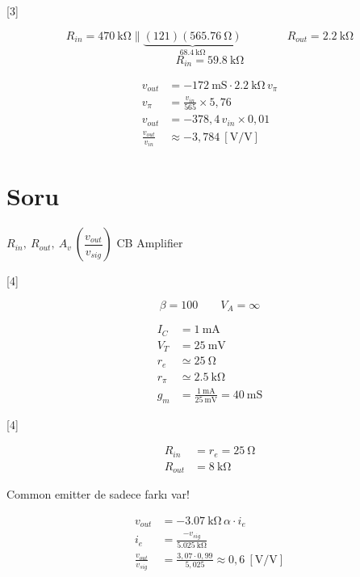 \documentclass[11pt,a4paper]{article}
\begin{document}
[3]

\[ R_{in} = \qty{470}{\kilo\ohm} \parallel \underbrace{(121)(\qty{565,76}{\ohm})}_{\qty{68,4}{\kilo\ohm}} \qquad\qquad R_{out} = \qty{2,2}{\kilo\ohm} \]
\[ R_{in} = \qty{59,8}{\kilo\ohm} \]

\begin{align*}
  v_{out} &= -\qty{172}{\milli\siemens} \cdot \qty{2,2}{\kilo\ohm}\, v_\pi \\
  v_\pi &= \frac{v_{in}}{565} \times 5{,}76 \\
  v_{out} &= -378{,}4\, v_{in} \times 0{,}01 \\
  \frac{v_{out}}{v_{in}} &\approx -3{,}784\ [\mathrm{V/V}]
\end{align*}

\section{Soru}

$R_{in},\ R_{out},\ A_v\ \left(\dfrac{v_{out}}{v_{sig}}\right)$ \quad \textcolor{kirmizikalem}{CB Amplifier}

[4]

\[ \beta = 100 \qquad V_A = \infty \]

\begin{align*}
  I_C &= \qty{1}{\milli\ampere} \\
  V_T &= \qty{25}{\milli\volt} \\
  r_e &\simeq \qty{25}{\ohm} \\
  r_\pi &\simeq \qty{2,5}{\kilo\ohm} \\
  g_m &= \frac{\qty{1}{\milli\ampere}}{\qty{25}{\milli\volt}} = \qty{40}{\milli\siemens}
\end{align*}

[4]

\begin{align*}
  R_{in} &= r_e = \qty{25}{\ohm} \\
  R_{out} &= \qty{8}{\kilo\ohm}
\end{align*}

\textcolor{kirmizikalem}{Common emitter de sadece  farkı var!}

\begin{align*}
  v_{out} &= -\qty{3,07}{\kilo\ohm}\,\alpha \cdot i_e \\
  i_e &= \frac{-v_{sig}}{\qty{5,025}{\kilo\ohm}} \\
  \frac{v_{out}}{v_{sig}} &= \frac{3{,}07 \cdot 0{,}99}{5{,}025} \approx 0{,}6\ [\mathrm{V/V}]
\end{align*}
\end{document}
